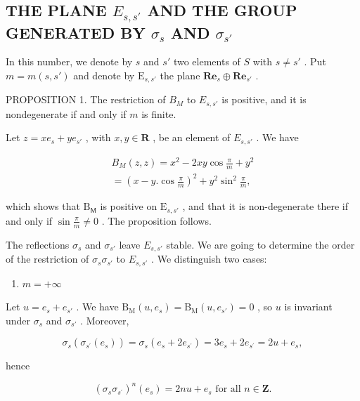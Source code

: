 \subsection{\texorpdfstring{THE PLANE \(E_{s,s'}\) AND THE GROUP GENERATED BY \(\sigma_{s}\) AND \(\sigma_{s'}\)}{THE PLANE E\_s,s' AND THE GROUP GENERATED BY sigma\_s AND sigma\_s'}}

In this number, we denote by \(s\) and \(s'\) two elements of \(S\) with \(s \neq s'\) . Put \(m = m(s, s')\) and denote by \(\mathrm{E}_{s,s'}\) the plane \(\mathbf{Re}_s \oplus \mathbf{Re}_{s'}\) .

PROPOSITION 1. The restriction of \(B_{M}\) to \(E_{s,s'}\) is positive, and it is nondegenerate if and only if \(m\) is finite.

Let \(z = xe_{s} + ye_{s'}\) , with \(x, y \in \mathbf{R}\) , be an element of \(E_{s,s'}\) . We have

\[
\begin{array}{r} B _ {M} (z, z) = x ^ {2} - 2 x y \cos \frac {\pi}{m} + y ^ {2} \\ = (x - y. \cos \frac {\pi}{m}) ^ {2} + y ^ {2} \sin^ {2} \frac {\pi}{m}, \end{array}
\]

which shows that \(\mathrm{B}_{\mathsf{M}}\) is positive on \(\mathrm{E}_{s,s'}\) , and that it is non-degenerate there if and only if \(\sin \frac{\pi}{m} \neq 0\) . The proposition follows.

The reflections \(\sigma_{s}\) and \(\sigma_{s'}\) leave \(E_{s,s'}\) stable. We are going to determine the order of the restriction of \(\sigma_{s}\sigma_{s'}\) to \(E_{s,s'}\) . We distinguish two cases:

\begin{enumerate}
\def\labelenumi{\alph{enumi})}
\tightlist
\item
  \(m = +\infty\)
\end{enumerate}

Let \(u = e_s + e_{s'}\) . We have \(\mathrm{B}_{\mathrm{M}}(u, e_s) = \mathrm{B}_{\mathrm{M}}(u, e_{s'}) = 0\) , so \(u\) is invariant under \(\sigma_s\) and \(\sigma_{s'}\) . Moreover,

\[
\sigma_ {s} \left(\sigma_ {s ^ {\prime}} \left(e _ {s}\right)\right) = \sigma_ {s} \left(e _ {s} + 2 e _ {s ^ {\prime}}\right) = 3 e _ {s} + 2 e _ {s ^ {\prime}} = 2 u + e _ {s},
\]

hence

\[
\left(\sigma_ {s} \sigma_ {s ^ {\prime}}\right) ^ {n} \left(e _ {s}\right) = 2 n u + e _ {s} \text {   for   all   } n \in \mathbf {Z}.
\]

